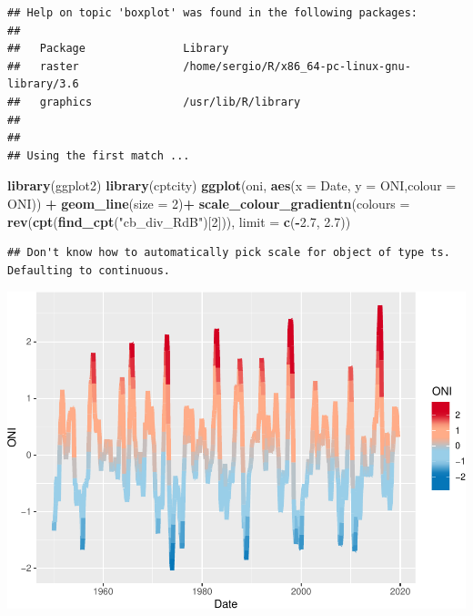 \documentclass[]{book}
\newenvironment{Shaded}{\begin{snugshade}}{\end{snugshade}}
\newcommand{\DataTypeTok}[1]{\textcolor[rgb]{0.13,0.29,0.53}{#1}}
\newcommand{\DecValTok}[1]{\textcolor[rgb]{0.00,0.00,0.81}{#1}}
\newcommand{\FloatTok}[1]{\textcolor[rgb]{0.00,0.00,0.81}{#1}}
\newcommand{\KeywordTok}[1]{\textcolor[rgb]{0.13,0.29,0.53}{\textbf{#1}}}
\newcommand{\NormalTok}[1]{#1}
\newcommand{\OperatorTok}[1]{\textcolor[rgb]{0.81,0.36,0.00}{\textbf{#1}}}
\newcommand{\StringTok}[1]{\textcolor[rgb]{0.31,0.60,0.02}{#1}}
\begin{document}
\begin{verbatim}
## Help on topic 'boxplot' was found in the following packages:
## 
##   Package               Library
##   raster                /home/sergio/R/x86_64-pc-linux-gnu-library/3.6
##   graphics              /usr/lib/R/library
## 
## 
## Using the first match ...
\end{verbatim}

\begin{Shaded}
\begin{Highlighting}[]
\KeywordTok{library}\NormalTok{(ggplot2)}
\KeywordTok{library}\NormalTok{(cptcity)}
\KeywordTok{ggplot}\NormalTok{(oni, }
       \KeywordTok{aes}\NormalTok{(}\DataTypeTok{x =}\NormalTok{ Date, }\DataTypeTok{y =}\NormalTok{ ONI,}\DataTypeTok{colour =}\NormalTok{ ONI)) }\OperatorTok{+}\StringTok{ }
\StringTok{  }\KeywordTok{geom_line}\NormalTok{(}\DataTypeTok{size =} \DecValTok{2}\NormalTok{)}\OperatorTok{+}
\KeywordTok{scale_colour_gradientn}\NormalTok{(}\DataTypeTok{colours =} \KeywordTok{rev}\NormalTok{(}\KeywordTok{cpt}\NormalTok{(}\KeywordTok{find_cpt}\NormalTok{(}\StringTok{"cb_div_RdB"}\NormalTok{)[}\DecValTok{2}\NormalTok{])), }
                       \DataTypeTok{limit =} \KeywordTok{c}\NormalTok{(}\OperatorTok{-}\FloatTok{2.7}\NormalTok{, }\FloatTok{2.7}\NormalTok{))}
\end{Highlighting}
\end{Shaded}

\begin{verbatim}
## Don't know how to automatically pick scale for object of type ts. Defaulting to continuous.
\end{verbatim}

\includegraphics{bookdown-demo_files/figure-latex/unnamed-chunk-41-1.pdf}
\end{document}
